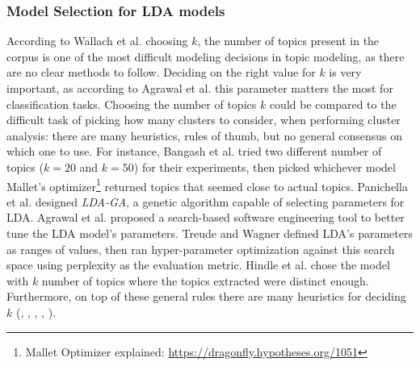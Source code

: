         \subsubsection{Model Selection for LDA models}
        
            According to Wallach et al. \cite{wallach2009rethinking} choosing $k$, the number of topics present in the corpus is one of the most difficult modeling decisions in topic modeling, as there are no clear methods to follow. Deciding on the right value for $k$ is very important, as according to Agrawal et al. \cite{agrawal2018wrong} this parameter matters the most for classification tasks. Choosing the number of topics $k$ could be compared to the difficult task of picking how many clusters to consider, when performing cluster analysis: there are many heuristics, rules of thumb, but no general consensus on which one to use. For instance, Bangash et al. \cite{bangash2019developers} tried two different number of topics ($k=20$ and $k=50$) for their experiments, then picked whichever model Mallet’s optimizer\footnote{Mallet Optimizer explained: \url{https://dragonfly.hypotheses.org/1051}} returned topics that seemed close to actual topics. Panichella et al. \cite{panichella2013effectively} designed \textit{LDA-GA}, a genetic algorithm capable of selecting parameters for LDA. Agrawal et al. \cite{agrawal2018wrong} proposed a search-based software engineering tool to better tune the LDA model's parameters. Treude and Wagner \cite{treude2019predicting} defined LDA's parameters as ranges of values, then ran hyper-parameter optimization against this search space using perplexity as the evaluation metric. Hindle et al. \cite{hindle2012relating} chose the model with $k$ number of topics where the topics extracted were distinct enough. Furthermore, on top of these general rules there are many heuristics for deciding $k$ (\cite{arun2010finding}, \cite{cao2009density}, \cite{deveaud2014accurate}, \cite{griffiths2004finding}, \cite{zhao2015heuristic}).
            
